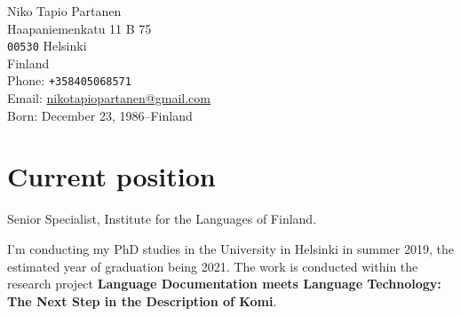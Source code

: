 \documentclass[11pt, a4paper]{article}
\begin{document}

\thispagestyle{empty}


{\LARGE Niko Tapio Partanen}\\[1cm] %
Haapaniemenkatu 11 B 75\\
\texttt{00530} Helsinki\\
Finland\\[.2cm]
Phone: \texttt{+358405068571}\\ %
Email: \href{mailto:nikotapiopartanen@gmail.com}{nikotapiopartanen@gmail.com}\\ %



Born: December 23, 1986–Finland\\ %


\section*{Current position}

Senior Specialist, Institute for the Languages of Finland.

\vspace{3mm}

I'm conducting my PhD studies in the University in Helsinki in summer 2019, the estimated year of graduation being 2021. The work is conducted within the research project \textbf{Language Documentation meets Language Technology: The Next Step in the Description of Komi}.

\end{document}

